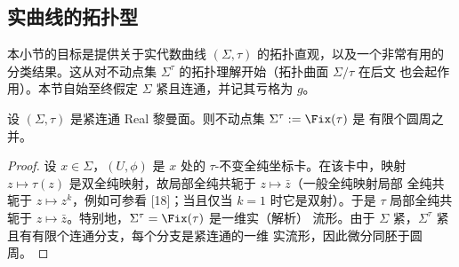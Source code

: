 \subsection{实曲线的拓扑型}
\label{sec:02.1.2}

本小节的目标是提供关于实代数曲线 $(\Sigma,\tau)$ 的拓扑直观，以及一个非常有用的
分类结果。这从对不动点集 $\Sigma^\tau$ 的拓扑理解开始（拓扑曲面 $\Sigma/\tau$ 在后文
也会起作用）。本节自始至终假定 $\Sigma$ 紧且连通，并记其亏格为 $g$。

\begin{proposition}\label{prop:2.1.3}
设 $(\Sigma,\tau)$ 是紧连通 Real 黎曼面。则不动点集 $\Sigma^\tau:=\Fix(\tau)$ 是
有限个圆周之并。
\end{proposition}

\begin{proof}
设 $x\in\Sigma$，$(U,\phi)$ 是 $x$ 处的 $\tau$-不变全纯坐标卡。在该卡中，映射
$z\mapsto\tau(z)$ 是双全纯映射，故局部全纯共轭于 $z\mapsto\bar z$（一般全纯映射局部
全纯共轭于 $z\mapsto z^k$，例如可参看 [18]；当且仅当 $k=1$ 时它是双射）。于是 $\tau$
局部全纯共轭于 $z\mapsto\bar z$。特别地，$\Sigma^\tau=\Fix(\tau)$ 是一维实（解析）
流形。由于 $\Sigma$ 紧，$\Sigma^\tau$ 紧且有有限个连通分支，每个分支是紧连通的一维
实流形，因此微分同胚于圆周。
\end{proof}
